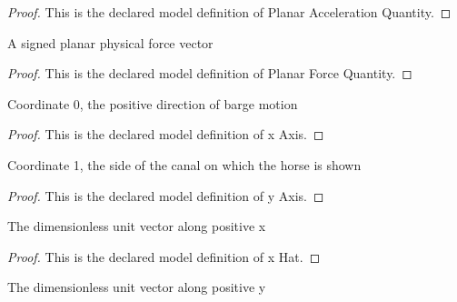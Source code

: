 \begin{proof}
  This is the declared model definition of Planar Acceleration Quantity.
\end{proof}
\begin{definition}
  \label{def:physics:phyx-mini-0760:phyxminiproblems-problemphyxmini0760-planarforcequantity}
  A signed planar physical force vector
\end{definition}
\begin{proof}
  This is the declared model definition of Planar Force Quantity.
\end{proof}
\begin{definition}[x Axis]
  \label{def:physics:phyx-mini-0760:phyxminiproblems-problemphyxmini0760-xaxis}
  Coordinate 0, the positive direction of barge motion
\end{definition}
\begin{proof}
  This is the declared model definition of x Axis.
\end{proof}
\begin{definition}[y Axis]
  \label{def:physics:phyx-mini-0760:phyxminiproblems-problemphyxmini0760-yaxis}
  Coordinate 1, the side of the canal on which the horse is shown
\end{definition}
\begin{proof}
  This is the declared model definition of y Axis.
\end{proof}
\begin{definition}[x Hat]
  \label{def:physics:phyx-mini-0760:phyxminiproblems-problemphyxmini0760-xhat}
  The dimensionless unit vector along positive x
\end{definition}
\begin{proof}
  This is the declared model definition of x Hat.
\end{proof}
\begin{definition}[y Hat]
  \label{def:physics:phyx-mini-0760:phyxminiproblems-problemphyxmini0760-yhat}
  The dimensionless unit vector along positive y
\end{definition}
